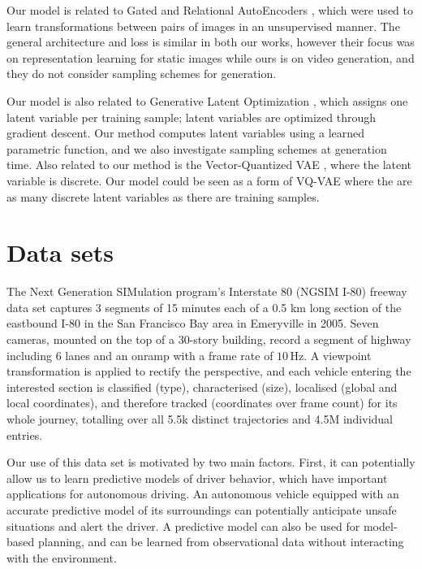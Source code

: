 \documentclass{article}
\begin{document}
Our model is related to Gated and Relational AutoEncoders \citep{RelationalAE, GAE}, which were used to learn transformations between pairs of images in an unsupervised manner.
The general architecture and loss is similar in both our works, however their focus was on representation learning for static images while ours is on video generation, and they do not consider sampling schemes for generation.

Our model is also related to Generative Latent Optimization \citep{GLO}, which assigns one latent variable per training sample; latent variables are optimized through gradient descent.
Our method computes latent variables using a learned parametric function, and we also investigate sampling schemes at generation time.
Also related to our method is the Vector-Quantized VAE \citep{VQVAE}, where the latent variable is discrete.
Our model could be seen as a form of VQ-VAE where the are as many discrete latent variables as there are training samples.

\section{Data sets}

The Next Generation SIMulation program's Interstate 80 (NGSIM I-80) freeway data set \cite{halkias2006ngsim} captures 3 segments of 15 minutes each of a 0.5 km long section of the eastbound I-80 in the San Francisco Bay area in Emeryville in 2005.
Seven cameras, mounted on the top of a 30-story building, record a segment of highway including 6 lanes and an onramp with a frame rate of $10\,\text{Hz}$.
A viewpoint transformation is applied to rectify the perspective, and each vehicle entering the interested section is classified (type), characterised (size), localised (global and local coordinates), and therefore tracked (coordinates over frame count) for its whole journey, totalling over all 5.5k distinct trajectories and 4.5M individual entries.

Our use of this data set is motivated by two main factors.
First, it can potentially allow us to learn predictive models of driver behavior, which have important applications for autonomous driving.
An autonomous vehicle equipped with an accurate predictive model of its surroundings can potentially anticipate unsafe situations and alert the driver.
A predictive model can also be used for model-based planning, and can be learned from observational data without interacting with the environment.
\end{document}
